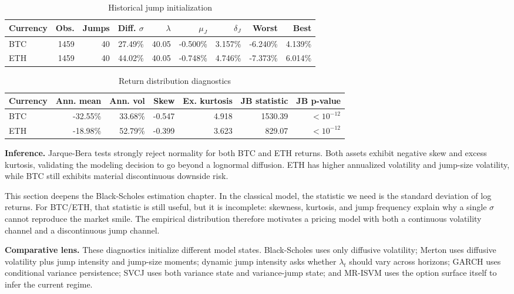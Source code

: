 \documentclass[11pt]{article}
\begin{document}
\begin{table}[H]
\centering
\caption{Historical jump initialization}
\begin{tabular}{lrrrrrrrr}
\toprule
Currency & Obs. & Jumps & Diff. $\sigma$ & $\lambda$ & $\mu_J$ & $\delta_J$ & Worst & Best\\
\midrule
BTC & 1459 & 40 & 27.49\% & 40.05 & -0.500\% & 3.157\% & -6.240\% & 4.139\%\\
ETH & 1459 & 40 & 44.02\% & 40.05 & -0.748\% & 4.746\% & -7.373\% & 6.014\%\\
\bottomrule
\end{tabular}
\end{table}

\begin{table}[H]
\centering
\caption{Return distribution diagnostics}
\begin{tabular}{lrrrrrr}
\toprule
Currency & Ann. mean & Ann. vol & Skew & Ex. kurtosis & JB statistic & JB p-value\\
\midrule
BTC & -32.55\% & 33.68\% & -0.547 & 4.918 & 1530.39 & $<10^{-12}$\\
ETH & -18.98\% & 52.79\% & -0.399 & 3.623 & 829.07 & $<10^{-12}$\\
\bottomrule
\end{tabular}
\end{table}

\textbf{Inference.} Jarque-Bera tests strongly reject normality for both BTC and ETH returns. Both assets exhibit negative skew and excess kurtosis, validating the modeling decision to go beyond a lognormal diffusion. ETH has higher annualized volatility and jump-size volatility, while BTC still exhibits material discontinuous downside risk.

This section deepens the Black-Scholes estimation chapter. In the classical model, the statistic we need is the standard deviation of log returns. For BTC/ETH, that statistic is still useful, but it is incomplete: skewness, kurtosis, and jump frequency explain why a single $\sigma$ cannot reproduce the market smile. The empirical distribution therefore motivates a pricing model with both a continuous volatility channel and a discontinuous jump channel.

\textbf{Comparative lens.} These diagnostics initialize different model states. Black-Scholes uses only diffusive volatility; Merton uses diffusive volatility plus jump intensity and jump-size moments; dynamic jump intensity asks whether $\lambda_t$ should vary across horizons; GARCH uses conditional variance persistence; SVCJ uses both variance state and variance-jump state; and MR-ISVM uses the option surface itself to infer the current regime.
\end{document}

